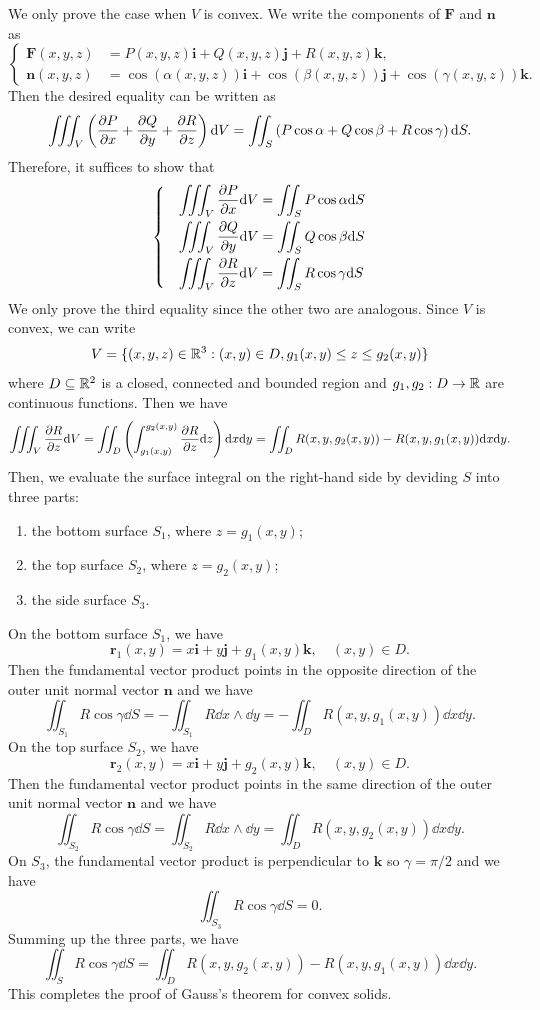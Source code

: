 \begin{proofenv}
    We only prove the case when $V$ is convex. We write the components of $\bm F$ and $\bm n$ as
    $$
    \begin{cases}
        \bm F(x,y,z)&= P(x,y,z)\bm i + Q(x,y,z)\bm j + R(x,y,z)\bm k,\\
        \bm n(x,y,z)&= \cos(\alpha(x,y,z))\bm i + \cos(\beta(x,y,z))\bm j + \cos(\gamma(x,y,z))\bm k.
    \end{cases}
    $$
    Then the desired equality can be written as
    $$ \iiint_V \left( \pdv{P}{x} + \pdv{Q}{y} + \pdv{R}{z} \right) \dd V = \iint_S \left( P\cos\alpha + Q\cos\beta + R\cos\gamma \right) \dd S. $$
    Therefore, it suffices to show that
    $$ \begin{cases}
        &\displaystyle \iiint_V \pdv{P}{x} \dd V = \iint_S P\cos\alpha \dd S\\[8pt]
        &\displaystyle \iiint_V \pdv{Q}{y} \dd V = \iint_S Q\cos\beta \dd S\\[8pt]
        &\displaystyle \iiint_V \pdv{R}{z} \dd V = \iint_S R\cos\gamma \dd S
    \end{cases}
    $$
    We only prove the third equality since the other two are analogous. Since $V$ is convex, we can write
    $$ V = \{(x,y,z)\in \mathbb{R}^3: (x,y)\in D, g_1(x,y) \le z \le g_2(x,y)\} $$
    where $D\subseteq \mathbb{R}^2$ is a closed, connected and bounded region and $g_1, g_2: D \to \mathbb{R}$ are continuous functions. Then we have
    $$ \iiint_V \pdv{R}{z} \dd V = \iint_D \left( \int_{g_1(x,y)}^{g_2(x,y)} \pdv{R}{z} \dd z \right) \dd x \dd y = \iint_D R(x,y,g_2(x,y)) - R(x,y,g_1(x,y)) \dd x \dd y. $$
    Then, we evaluate the surface integral on the right-hand side by deviding $S$ into three parts:
    \begin{enumerate}
        \item the bottom surface $S_1$, where $z=g_1(x,y)$;
        \item the top surface $S_2$, where $z=g_2(x,y)$;
        \item the side surface $S_3$.
    \end{enumerate}
    On the bottom surface $S_1$, we have
    $$
    \bm r_1(x,y) = x\bm i + y\bm j + g_1(x,y)\bm k, \quad (x,y)\in D.
    $$
    Then the fundamental vector product points in the opposite direction of the outer unit normal vector $\bm n$ and we have
    $$
    \iint_{S_1} R\cos\gamma \dd S = -\iint_{S_1} R \dd x \wedge \dd y = -\iint_D R(x,y,g_1(x,y)) \dd x \dd y.
    $$
    On the top surface $S_2$, we have
    $$
    \bm r_2(x,y) = x\bm i + y\bm j + g_2(x,y)\bm k, \quad (x,y)\in D.
    $$
    Then the fundamental vector product points in the same direction of the outer unit normal vector $\bm n$ and we have
    $$
    \iint_{S_2} R\cos\gamma \dd S = \iint_{S_2} R \dd x \wedge \dd y = \iint_D R(x,y,g_2(x,y)) \dd x \dd y.
    $$
    On $S_3$, the fundamental vector product is perpendicular to $\bm k$ so $\gamma = \pi/2$ and we have
    $$
    \iint_{S_3} R\cos\gamma \dd S = 0.
    $$
    Summing up the three parts, we have
    $$ \iint_S R\cos\gamma \dd S = \iint_D R(x,y,g_2(x,y)) - R(x,y,g_1(x,y)) \dd x \dd y. $$
    This completes the proof of Gauss's theorem for convex solids.
\end{proofenv}
